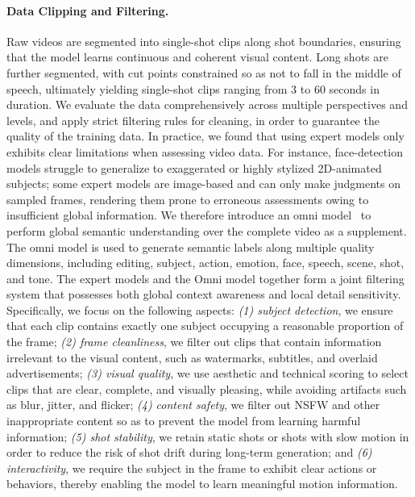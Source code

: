 \paragraph{Data Clipping and Filtering.}
Raw videos are segmented into single-shot clips along shot boundaries, ensuring that the model learns continuous and coherent visual content. Long shots are further segmented, with cut points constrained so as not to fall in the middle of speech, ultimately yielding single-shot clips ranging from 3 to 60 seconds in duration. We evaluate the data comprehensively across multiple perspectives and levels, and apply strict filtering rules for cleaning, in order to guarantee the quality of the training data. In practice, we found that using expert models only exhibits clear limitations when assessing video data. For instance, face-detection models struggle to generalize to exaggerated or highly stylized 2D-animated subjects; some expert models are image-based and can only make judgments on sampled frames, rendering them prone to erroneous assessments owing to insufficient global information. We therefore introduce an omni model~\cite{xu2025qwen3,team2023gemini} to perform global semantic understanding over the complete video as a supplement. The omni model is used to generate semantic labels along multiple quality dimensions, including editing, subject, action, emotion, face, speech, scene, shot, and tone. The expert models and the Omni model together form a joint filtering system that possesses both global context awareness and local detail sensitivity. Specifically, we focus on the following aspects: \textit{(1) subject detection}, we ensure that each clip contains exactly one subject occupying a reasonable proportion of the frame; \textit{(2) frame cleanliness}, we filter out clips that contain information irrelevant to the visual content, such as watermarks, subtitles, and overlaid advertisements; \textit{(3) visual quality}, we use aesthetic and technical scoring to select clips that are clear, complete, and visually pleasing, while avoiding artifacts such as blur, jitter, and flicker; \textit{(4) content safety}, we filter out NSFW and other inappropriate content so as to prevent the model from learning harmful information; \textit{(5) shot stability}, we retain static shots or shots with slow motion in order to reduce the risk of shot drift during long-term generation; and \textit{(6) interactivity}, we require the subject in the frame to exhibit clear actions or behaviors, thereby enabling the model to learn meaningful motion information.


